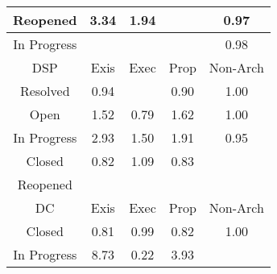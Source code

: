 \begin{tabular}{|c||c|c|c|c|}
\hline
Reopened & \cellcolor[rgb]{0.7948418187607575,0.7854513878340431,0.42} 3.34 & \cellcolor[rgb]{0.8639202217619644,0.8181727366240884,0.42} 1.94 &  & \cellcolor[rgb]{0.9038327885803732,0.8108085326137666,0.41424393600834836} 0.97 \\ 
\hline
In Progress &  &  &  & \cellcolor[rgb]{0.9067005967231856,0.8243828244897449,0.4169205569416398} 0.98 \\ 
\hline
\hline
DSP & Exis & Exec & Prop & Non-Arch \\ 
\hline
Resolved & \cellcolor[rgb]{0.8992131869151155,0.7889424180648797,0.4099323077874411} 0.94 &  & \cellcolor[rgb]{0.8923928366911855,0.7566594270049443,0.40356664757843974} 0.90 & \cellcolor[rgb]{0.9099157623834995,0.8399600979711311,0.42} 1.00 \\ 
\hline
Open & \cellcolor[rgb]{0.8843271193451292,0.8278391617950612,0.42} 1.52 & \cellcolor[rgb]{0.8721787007225115,0.6609791834198872,0.38470012067434395} 0.79 & \cellcolor[rgb]{0.8795561171178596,0.8255792133716177,0.42} 1.62 & \cellcolor[rgb]{0.9091448913705691,0.8359524858206934,0.4192018986125311} 1.00 \\ 
\hline
In Progress & \cellcolor[rgb]{0.8153593235765256,0.79517020590467,0.42} 2.93 & \cellcolor[rgb]{0.8855817655709399,0.8284334679020241,0.42} 1.50 & \cellcolor[rgb]{0.8651806514349405,0.818769782258656,0.42} 1.91 & \cellcolor[rgb]{0.9016378223104199,0.8004190256026543,0.4121953008230586} 0.95 \\ 
\hline
Closed & \cellcolor[rgb]{0.8767743640882579,0.682731990017754,0.388989406482374} 0.82 & \cellcolor[rgb]{0.9057986004541518,0.8380098633730193,0.42} 1.09 & \cellcolor[rgb]{0.8785168328505021,0.6909796754923762,0.3906157106604685} 0.83 &  \\ 
\hline
Reopened &  &  &  &  \\ 
\hline
\hline
DC & Exis & Exec & Prop & Non-Arch \\ 
\hline
Closed & \cellcolor[rgb]{0.875996245246948,0.6790488941688871,0.3882631622304848} 0.81 & \cellcolor[rgb]{0.9085080195344444,0.8329379591297031,0.41860748489881466} 0.99 & \cellcolor[rgb]{0.8763389454081363,0.6806710082651782,0.38858301571426046} 0.82 & \cellcolor[rgb]{0.9098855178889856,0.8399457716316248,0.42} 1.00 \\ 
\hline
In Progress & \cellcolor[rgb]{0.53,0.66,0.42} 8.73 & \cellcolor[rgb]{0.7676390427834929,0.16615813584186656,0.28712977326459344} 0.22 & \cellcolor[rgb]{0.7662087731518644,0.7718883662298306,0.42000000000000004} 3.93 &  \\ 

\end{tabular}
